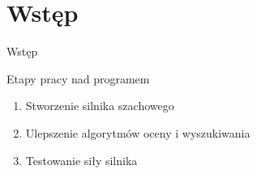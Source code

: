 \section{Wstęp}\label{sec:wstep}

\begin{frame}{Wstęp}


    \begin{block}{Etapy pracy nad programem}
        \begin{enumerate}
            \item Stworzenie silnika szachowego
            \item Ulepszenie algorytmów oceny i wyszukiwania
            \item Testowanie siły silnika
        \end{enumerate}
    \end{block}

\end{frame}